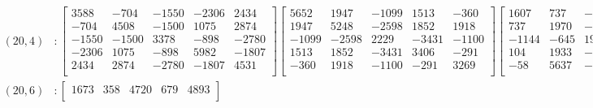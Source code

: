 \documentclass[12pt]{amsart}
\theoremstyle{plain}
\theoremstyle{definition}
\begin{document}
\begin{landscape}
\thispagestyle{empty}
\tiny
\begin{align*} 
(20,4) &:
\begin{bmatrix}
3588  &   -704  &   -1550  &   -2306  &   2434  \\ 
 -704  &   4508  &   -1500  &   1075  &   2874  \\ 
 -1550  &   -1500  &   3378  &   -898  &   -2780  \\ 
 -2306  &   1075  &   -898  &   5982  &   -1807  \\ 
 2434  &   2874  &   -2780  &   -1807  &   4531  \\ 
\end{bmatrix}
\begin{bmatrix}
5652  &   1947  &   -1099  &   1513  &   -360  \\ 
 1947  &   5248  &   -2598  &   1852  &   1918  \\ 
 -1099  &   -2598  &   2229  &   -3431  &   -1100  \\ 
 1513  &   1852  &   -3431  &   3406  &   -291  \\ 
 -360  &   1918  &   -1100  &   -291  &   3269  \\ 
\end{bmatrix}
\begin{bmatrix}
1607  &   737  &   -1144  &   104  &   -58  \\ 
 737  &   1970  &   -645  &   1933  &   5637  \\ 
 -1144  &   -645  &   1961  &   -2956  &   -1981  \\ 
 104  &   1933  &   -2956  &   1073  &   -2666  \\ 
 -58  &   5637  &   -1981  &   -2666  &   -415  \\ 
\end{bmatrix}
\begin{bmatrix}
-1928  &   360  &   -26  &   30  &   -1010  \\ 
 360  &   -4179  &   1947  &   -721  &   -3177  \\ 
 -26  &   1947  &   -2645  &   2578  &   1297  \\ 
 30  &   -721  &   2578  &   -3029  &   -208  \\ 
 -1010  &   -3177  &   1297  &   -208  &   -3329  \\ 
\end{bmatrix}
\\
(20,6) &:
\begin{bmatrix}
1673  &   358  &   4720  &   679  &   4893  \\ 

\end{bmatrix}
\end{align*}
\end{landscape}
\end{document}
